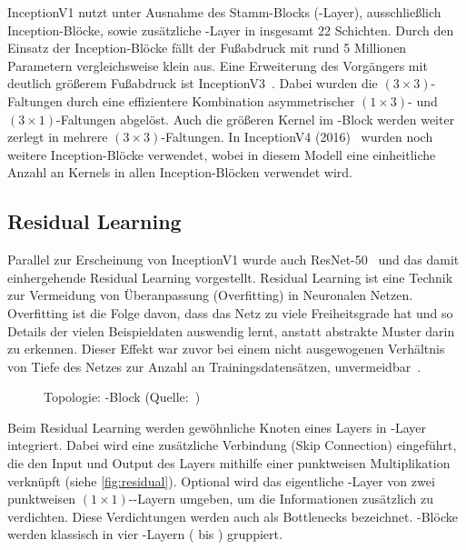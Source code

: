InceptionV1 nutzt unter Ausnahme des Stamm-Blocks (\stem-Layer), ausschließlich Inception-Blöcke, sowie zusätzliche \pool-Layer in insgesamt 22 Schichten.
Durch den Einsatz der Inception-Blöcke fällt der Fußabdruck mit rund 5 Millionen Parametern vergleichsweise klein aus.
Eine Erweiterung des Vorgängers mit deutlich größerem Fußabdruck ist InceptionV3~\cite{Szegedy15}.
Dabei wurden die $(3 \times 3)$-Faltungen durch eine effizientere Kombination asymmetrischer $(1 \times 3)$- und $(3 \times 1)$-Faltungen abgelöst.
Auch die größeren Kernel im \stem-Block werden weiter zerlegt in mehrere $(3 \times 3)$-Faltungen.
In InceptionV4 (2016)~\cite{Szegedy16} wurden noch weitere Inception-Blöcke verwendet, wobei in diesem Modell eine einheitliche Anzahl an Kernels in allen Inception-Blöcken verwendet wird.

\subsection{Residual Learning}
\label{subsec:residual-learning}

Parallel zur Erscheinung von InceptionV1 wurde auch ResNet-50~\cite{He15} und das damit einhergehende Residual Learning vorgestellt.
Residual Learning ist eine Technik zur Vermeidung von Überanpassung (Overfitting) in Neuronalen Netzen.
Overfitting ist die Folge davon, dass das Netz zu viele Freiheitsgrade hat und so Details der vielen Beispieldaten auswendig lernt, anstatt abstrakte Muster darin zu erkennen.
Dieser Effekt war zuvor bei einem nicht ausgewogenen Verhältnis von Tiefe des Netzes zur Anzahl an Trainingsdatensätzen, unvermeidbar~\cite{Gugger20}.

\begin{figure}[hb!]
    \centering
    \caption{Topologie: \res-Block (Quelle:~\cite{Karim19})}
    \label{fig:residual}
\end{figure}

Beim Residual Learning werden gewöhnliche Knoten eines Layers in \res-Layer integriert.
Dabei wird eine zusätzliche Verbindung (Skip Connection) eingeführt, die den Input und Output des Layers mithilfe einer punktweisen Multiplikation verknüpft (siehe \autoref{fig:residual}).
Optional wird das eigentliche \conv-Layer von zwei punktweisen $(1 \times 1)$-\conv-Layern umgeben, um die Informationen zusätzlich zu verdichten.
Diese Verdichtungen werden auch als Bottlenecks bezeichnet.
\res-Blöcke werden klassisch in vier \res-Layern ( bis ) gruppiert.

